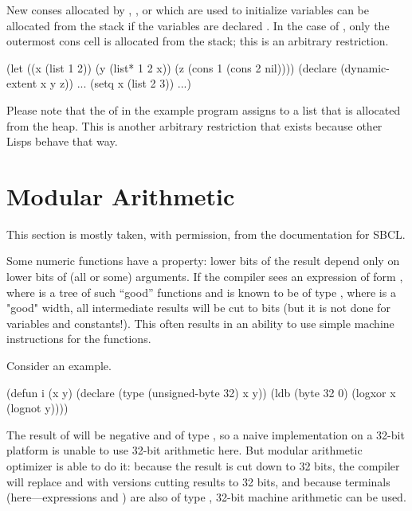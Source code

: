 New conses allocated by , , or 
which are used to initialize variables can be allocated from the stack
if the variables are declared .  In the case of
, only the outermost cons cell is allocated from the stack;
this is an arbitrary restriction.

\begin{lisp}
(let ((x (list 1 2))
      (y (list* 1 2 x))
      (z (cons 1 (cons 2 nil))))
  (declare (dynamic-extent x y z))
  ...
  (setq x (list 2 3))
  ...)
\end{lisp}

Please note that the  of  in the example program
assigns to  a list that is allocated from the heap.  This is
another arbitrary restriction that exists because other Lisps behave
that way.

\section{Modular Arithmetic}

This section is mostly taken, with permission,  from the documentation
for SBCL.

Some numeric functions have a property:  lower bits of
the result depend only on  lower bits of (all or some)
arguments. If the compiler sees an expression of form , where  is a tree of such ``good'' functions
and  is known to be of type , where  is a "good" width, all intermediate results
will be cut to  bits (but it is not done for variables
and constants!). This often results in an ability to use simple
machine instructions for the functions.

Consider an example.
\begin{lisp}
(defun i (x y)
  (declare (type (unsigned-byte 32) x y))
  (ldb (byte 32 0) (logxor x (lognot y))))
\end{lisp}
The result of  will be negative and of
type , so a naive implementation on a 32-bit
platform is unable to use 32-bit arithmetic here. But modular
arithmetic optimizer is able to do it: because the result is cut down
to 32 bits, the compiler will replace 
and  with versions cutting results to 32 bits, and
because terminals (here---expressions  and )
are also of type , 32-bit machine
arithmetic can be used.


